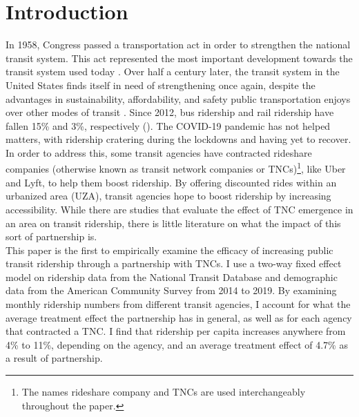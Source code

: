 \documentclass [12pt]{report}
\begin{document}
\section*{Introduction}
In 1958, Congress passed a transportation act in order to strengthen the national transit system. This act represented the most important development towards the transit system used today \parencite{ftaweb}. Over half a century later, the transit system in the United States finds itself in need of strengthening once again, despite the advantages in sustainability, affordability, and safety public transportation enjoys over other modes of transit \parencite{atpafact}. Since 2012, bus ridership and rail ridership have fallen 15\% and 3\%, respectively (\cite{erhardt22}). The COVID-19 pandemic has not helped matters, with ridership cratering during the lockdowns and having yet to recover. \\
\indent In order to address this, some transit agencies have contracted rideshare companies (otherwise known as transit network companies or TNCs)\footnote{The names rideshare company and TNCs are used interchangeably throughout the paper.}, like Uber and Lyft, to help them boost ridership. By offering discounted rides within an urbanized area (UZA), transit agencies hope to boost ridership by increasing accessibility. While there are studies that evaluate the effect of TNC emergence in an area on transit ridership, there is little literature on what the impact of this sort of partnership is.\\
\indent This paper is the first to empirically examine the efficacy of increasing public transit ridership through a partnership with
TNCs. I use a two-way fixed effect model on ridership data from the National Transit Database and demographic data from the American Community Survey from 2014 to 2019. By examining monthly ridership numbers from different transit agencies, I account for what the average treatment effect the partnership has in general, as well as for each agency that contracted a TNC. I find that ridership per capita increases anywhere from 4\% to 11\%, depending on the agency, and an average treatment effect of 4.7\% as a result of partnership.

\end{document}
